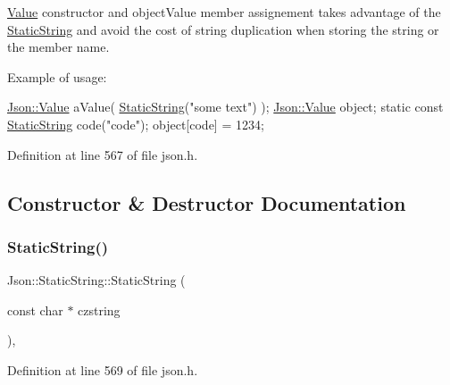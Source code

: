 \hyperlink{class_json_1_1_value}{Value} constructor and object\+Value member assignement takes advantage of the \hyperlink{class_json_1_1_static_string}{Static\+String} and avoid the cost of string duplication when storing the string or the member name.

Example of usage\+: 
\begin{DoxyCode}
\hyperlink{class_json_1_1_value}{Json::Value} aValue( \hyperlink{class_json_1_1_static_string_afb6baf1ec078ce76f0b0f9b39d19437f}{StaticString}(\textcolor{stringliteral}{"some text"}) );
\hyperlink{class_json_1_1_value}{Json::Value} object;
\textcolor{keyword}{static} \textcolor{keyword}{const} \hyperlink{class_json_1_1_static_string_afb6baf1ec078ce76f0b0f9b39d19437f}{StaticString} code(\textcolor{stringliteral}{"code"});
\textcolor{keywordtype}{object}[code] = 1234;
\end{DoxyCode}
 

Definition at line 567 of file json.\+h.



\subsection{Constructor \& Destructor Documentation}
\hypertarget{class_json_1_1_static_string_afb6baf1ec078ce76f0b0f9b39d19437f}{}\label{class_json_1_1_static_string_afb6baf1ec078ce76f0b0f9b39d19437f} 
\subsubsection{\texorpdfstring{Static\+String()}{StaticString()}\hspace{0.1cm}{\footnotesize\ttfamily [1/2]}}
{\footnotesize\ttfamily Json\+::\+Static\+String\+::\+Static\+String (\begin{DoxyParamCaption}\item[{const char $\ast$}]{czstring }\end{DoxyParamCaption})\hspace{0.3cm}{\ttfamily [inline]}, {\ttfamily [explicit]}}



Definition at line 569 of file json.\+h.

\hypertarget{class_json_1_1_static_string_afb6baf1ec078ce76f0b0f9b39d19437f}{}\label{class_json_1_1_static_string_afb6baf1ec078ce76f0b0f9b39d19437f} 
